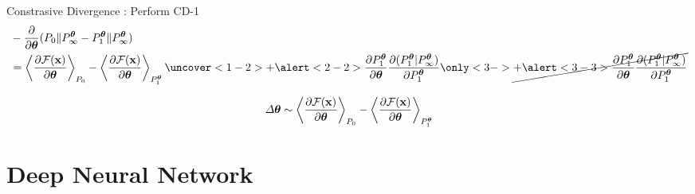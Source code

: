 	\begin{frame}[t]{Constrasive Divergence}
	:
	 Perform CD-1
	    \begin{align}
	    &-\dfrac{\partial}{\partial \btheta} (P_0\|P_{\infty}^{\btheta} - P_{1}^{\btheta}\|P_{\infty}^{\btheta})\nonumber\\\vspace{3mm}
	    &=\left\langle \frac{\partial \mathcal{F}(\x)}{\partial \boldsymbol{\theta}}\right\rangle_{P_0} 
		  -\left\langle \frac{\partial \mathcal{F}(\x)}{\partial \boldsymbol{\theta}}\right\rangle_{P_{1}^{\btheta}}\nonumber
		  \uncover<1-2>{+ \alert<2-2>{\frac{\partial P_{1}^{\btheta}}{\partial \btheta} \frac{\partial (P_{1}^{\btheta}|P_{\infty}^{\btheta})}{\partial P_{1}^{\btheta}}\nonumber}}
		  \only<3->{ \cancel{+\alert<3-3>{\frac{\partial P_{1}^{\btheta}}{\partial \btheta} \frac{\partial (P_{1}^{\btheta}|P_{\infty}^{\btheta})}{\partial P_{1}^{\btheta}}\nonumber}}}
	    \end{align}
	    
	 {
	 \begin{align}
	  \Delta \boldsymbol{\theta} \sim \left\langle \frac{\partial \mathcal{F}(\mathbf{x})}{\partial \boldsymbol{\theta}}\right\rangle_{P_0} 
		  -\left\langle \frac{\partial \mathcal{F}(\mathbf{x})}{\partial \boldsymbol{\theta}}\right\rangle_{P_{1}^{\boldsymbol{\theta}}}\nonumber
	 \end{align}
	}
	\end{frame}
% 
% 
% 
% 
% 
%   

\section{Deep Neural Network}%
